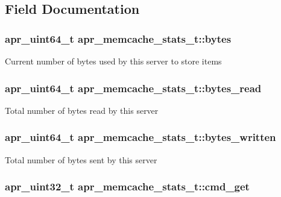 \subsection{Field Documentation}
\hypertarget{structapr__memcache__stats__t_a327ed9d43d6df23337101eda379a7870}{
\subsubsection[{bytes}]{\setlength{\rightskip}{0pt plus 5cm}apr\-\_\-uint64\-\_\-t apr\-\_\-memcache\-\_\-stats\-\_\-t\-::bytes}}\label{structapr__memcache__stats__t_a327ed9d43d6df23337101eda379a7870}
Current number of bytes used by this server to store items \hypertarget{structapr__memcache__stats__t_acf5d7892543403de8a48e9276d94b5af}{
\subsubsection[{bytes\-\_\-read}]{\setlength{\rightskip}{0pt plus 5cm}apr\-\_\-uint64\-\_\-t apr\-\_\-memcache\-\_\-stats\-\_\-t\-::bytes\-\_\-read}}\label{structapr__memcache__stats__t_acf5d7892543403de8a48e9276d94b5af}
Total number of bytes read by this server \hypertarget{structapr__memcache__stats__t_a05f5b9a19c330460fe66b79746989094}{
\subsubsection[{bytes\-\_\-written}]{\setlength{\rightskip}{0pt plus 5cm}apr\-\_\-uint64\-\_\-t apr\-\_\-memcache\-\_\-stats\-\_\-t\-::bytes\-\_\-written}}\label{structapr__memcache__stats__t_a05f5b9a19c330460fe66b79746989094}
Total number of bytes sent by this server \hypertarget{structapr__memcache__stats__t_abd9b0fa7bf554436883c8b6a2a89c2a8}{
\subsubsection[{cmd\-\_\-get}]{\setlength{\rightskip}{0pt plus 5cm}apr\-\_\-uint32\-\_\-t apr\-\_\-memcache\-\_\-stats\-\_\-t\-::cmd\-\_\-get}}\label{structapr__memcache__stats__t_abd9b0fa7bf554436883c8b6a2a89c2a8}
